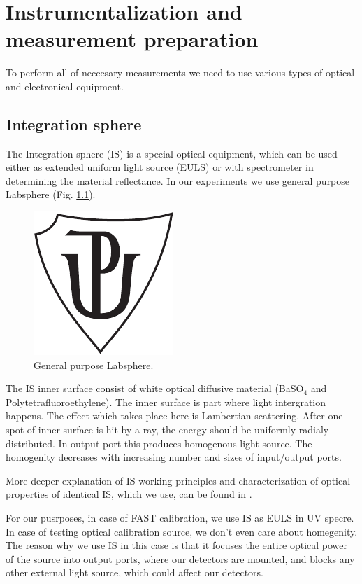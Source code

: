 
\chapter{Instrumentalization and measurement preparation}
To perform all of neccesary measurements we need to use various types of optical and electronical equipment.
\section{Integration sphere}
The Integration sphere (IS) is a special optical equipment, which can be used either as extended uniform light source (EULS) or with spectrometer in determining the material reflectance. In our experiments we use general purpose Labsphere (Fig. \ref{Labsphere}).

\begin{figure}[H]
 \includegraphics{up_logo_bw}
 \caption{General purpose Labsphere.}
 \label{Labsphere}
 
\end{figure}
\par
The IS inner surface consist of white optical diffusive material (BaSO$_4$ and Polytetrafluoroethylene). The inner surface is part where light intergration happens. The effect which takes place here is Lambertian scattering. After one spot of inner surface is hit by a ray, the energy should be uniformly radialy distributed. In output port this produces homogenous light source. The homogenity decreases with increasing number and sizes of input/output ports.
\par

\par
More deeper explanation of IS working principles and characterization of optical properties of identical IS, which we use, can be found in \cite{VACULA2021167169}.
\par
For our pusrposes, in case of FAST calibration, we use IS as EULS in UV specre. In case of testing optical calibration source, we don't even care about homegenity. The reason why we use IS in this case is that it focuses the entire optical power of the source into output ports, where  our detectors are mounted, and blocks any other external light source, which could affect our detectors.

